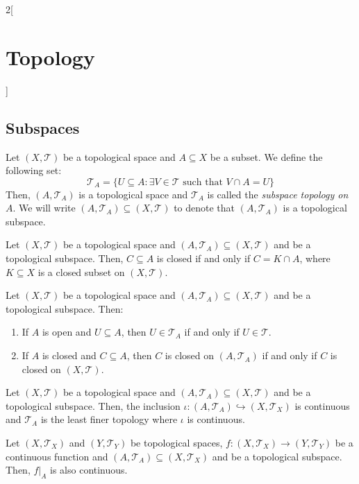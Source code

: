 \documentclass[../../../main.tex]{subfiles}
\begin{document}
\begin{multicols}{2}[\section{Topology}]
  \subsection{Subspaces}
  \begin{definition}
    Let $(X,\mathcal{T})$ be a topological space and $A\subseteq X$ be a subset. We define the following set: $$\mathcal{T}_A=\{U\subseteq A:\exists V\in\mathcal{T}\text{ such that }V\cap A=U\}$$ Then, $(A,\mathcal{T}_A)$ is a topological space and $\mathcal{T}_A$ is called the \textit{subspace topology on $A$}. We will write $(A,\mathcal{T}_A)\subseteq (X,\mathcal{T})$ to denote that $(A,\mathcal{T}_A)$ is a topological subspace.
  \end{definition}
  \begin{prop}
    Let $(X,\mathcal{T})$ be a topological space and $(A,\mathcal{T}_A)\subseteq (X,\mathcal{T})$ and be a topological subspace. Then, $C\subseteq A$ is closed if and only if $C=K\cap A$, where $K\subseteq X$ is a closed subset on $(X,\mathcal{T})$.
  \end{prop}
  \begin{prop}
    Let $(X,\mathcal{T})$ be a topological space and $(A,\mathcal{T}_A)\subseteq (X,\mathcal{T})$ and be a topological subspace. Then:
    \begin{enumerate}
      \item If $A$ is open and $U\subseteq A$, then $U\in\mathcal{T}_A$ if and only if $U\in\mathcal{T}$.
      \item If $A$ is closed and $C\subseteq A$, then $C$ is closed on $(A,\mathcal{T}_A)$ if and only if $C$ is closed on $(X,\mathcal{T})$.
    \end{enumerate}
  \end{prop}
  \begin{prop}
    Let $(X,\mathcal{T})$ be a topological space and $(A,\mathcal{T}_A)\subseteq (X,\mathcal{T})$ and be a topological subspace. Then, the inclusion $\iota:(A,\mathcal{T}_A)\hookrightarrow (X,\mathcal{T}_X)$ is continuous and $\mathcal{T}_A$ is the least finer topology where $\iota$ is continuous.
  \end{prop}
  \begin{corollary}
    Let $(X,\mathcal{T}_X)$ and $(Y,\mathcal{T}_Y)$ be topological spaces, $f:(X,\mathcal{T}_X)\rightarrow (Y,\mathcal{T}_Y)$ be a continuous function and $(A,\mathcal{T}_A)\subseteq (X,\mathcal{T}_X)$ and be a topological subspace. Then, $f|_A$ is also continuous.
  \end{corollary}
  \begin{prop}

\end{prop}
\end{multicols}
\end{document}
